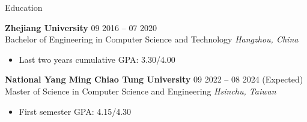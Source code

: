 \documentclass{resume} %
\begin{document}

\begin{rSection}{Education}

{\bf Zhejiang University} \hfill {09 2016 – 07 2020}\\
Bachelor of Engineering in Computer Science and Technology \hfill \textit{Hangzhou, China}
\begin{itemize}
    \item Last two years cumulative GPA: 3.30/4.00
\end{itemize}

{\bf National Yang Ming Chiao Tung University} \hfill {09 2022 – 08 2024 (Expected)}\\
Master of Science in Computer Science and Engineering \hfill \textit{Hsinchu, Taiwan}
\begin{itemize}
    \item First semester GPA: 4.15/4.30
\end{itemize}

\end{rSection}

\end{document}
